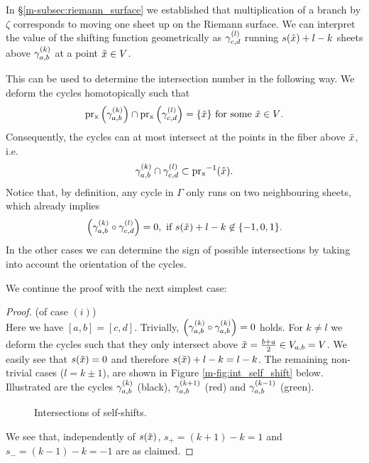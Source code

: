\documentclass[main.tex]{subfiles}
\begin{document}
  In \S \ref{m-subsec:riemann_surface} we established that multiplication of a branch by $\zeta$ corresponds to moving
  one sheet up on the Riemann surface.
  We can interpret the value of the shifting function geometrically as
  $\gamma_{c,d}^{(l)}$ running $s(\tilde{x})+l-k$ sheets above $\gamma_{a,b}^{(k)}$ at a point $\tilde{x} \in V$.
  
 This can be used to determine the intersection number in the following way. We deform the cycles homotopically
 such that
 \begin{equation*}
   \operatorname{pr_x}\left(\gamma_{a,b}^{(k)}\right) \cap \operatorname{pr_x}\left(\gamma_{c,d}^{(l)}\right) = \{ \tilde{x} \}  \text{ for some $\tilde{x} \in V$.} 
 \end{equation*}
 Consequently, the cycles can at most intersect at the
 points in the fiber above $\tilde{x}$, i.e.
 \begin{equation*}
  \gamma_{a,b}^{(k)} \cap \gamma_{c,d}^{(l)} \subset \operatorname{pr_x}^{-1}(\tilde{x}).
 \end{equation*}
 Notice that, by definition, any cycle in $\Gamma$ only runs on two neighbouring sheets, which already implies
 \begin{equation*}
   \left(\gamma_{a,b}^{(k)} \circ \gamma_{c,d}^{(l)}\right) = 0, \text{ if $s(\tilde{x})+l-k \not\in \{-1,0,1\}$.}
 \end{equation*}
  In the other cases we can determine the
  sign of possible intersections by taking into account the orientation of the cycles.
  
 We continue the proof with the next simplest case:
 \begin{proof}\let\qed\relax (of case $(i)$) \\
 Here we have $[a,b] = [c,d]$. Trivially, $\left( \gamma_{a,b}^{(k)} \circ \gamma_{a,b}^{(k)} \right) = 0$ holds. For $k \ne l$ we deform the cycles such that they only intersect above
 $\tilde{x} = \frac{b+a}{2} \in  V_{a,b}= V$.
  We easily see that $s(\tilde{x}) = 0$ and therefore $s(\tilde{x}) + l - k = l - k$. The remaining non-trivial cases
 ($l = k \pm 1$), are shown in Figure \ref{m-fig:int_self_shift} below.
   Illustrated are the cycles $\gamma_{a,b}^{(k)}$ (black),
      $\gamma_{a,b}^{(k+1)}$ (red) and $\gamma_{a,b}^{(k-1)}$ (green).
    \begin{figure}[H]
      \begin{center}
   \scalebox{0.8}{}
      \end{center}
    \caption{Intersections of self-shifts.}
    \label{fig:int_self_shift}
\end{figure}
  We see that, independently of $s(\tilde{x})$, $s_+ = (k+1)-k = 1$ and $s_- = (k-1)-k = -1$ are as claimed.
 \end{proof}
\end{document}
